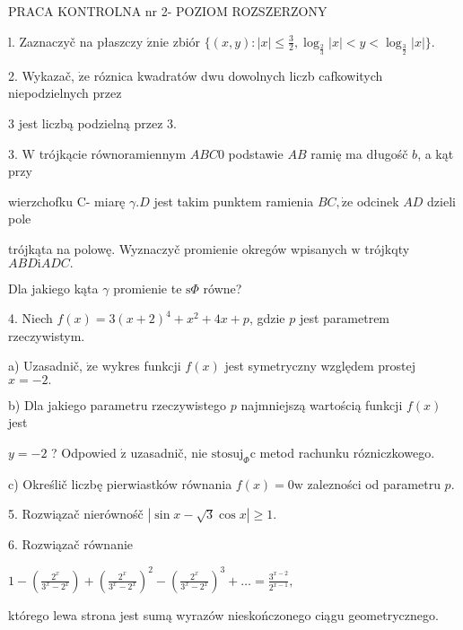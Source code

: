 \documentclass[a4paper,12pt]{article}
\begin{document}
PRACA KONTROLNA nr 2- POZIOM ROZSZERZONY

l. Zaznaczyč na płaszczy $\acute{\mathrm{z}}\mathrm{n}\mathrm{i}\mathrm{e}$ zbiór $\displaystyle \{(x,y):|x|\leq\frac{3}{2},\log_{\frac{2}{3}}|x|<y<\log_{\frac{3}{2}}|x|\}.$

2. Wykazač, $\dot{\mathrm{z}}\mathrm{e}$ róznica kwadratów dwu dowolnych liczb cafkowitych niepodzielnych przez

3 jest liczbą podzielną przez 3.

3. $\mathrm{W}$ trójkącie równoramiennym $ABC0$ podstawie $AB$ ramię ma długośč $b$, a kąt przy

wierzchofku C- miarę $\gamma. D$ jest takim punktem ramienia $BC, \dot{\mathrm{z}}\mathrm{e}$ odcinek $AD$ dzieli pole

trójkąta na polowę. Wyznaczyč promienie okregów wpisanych $\mathrm{w}$ trójkqty $ABD\mathrm{i}ADC.$

Dla jakiego kąta $\gamma$ promienie te $\mathrm{s}\Phi$ równe?

4. Niech $f(x)=3(x+2)^{4}+x^{2}+4x+p$, gdzie $p$ jest parametrem rzeczywistym.

a) Uzasadnič, $\dot{\mathrm{z}}\mathrm{e}$ wykres funkcji $f(x)$ jest symetryczny względem prostej $x=-2.$

b) Dla jakiego parametru rzeczywistego $p$ najmniejszą wartością funkcji $f(x)$ jest

$y=-2$ ? Odpowied $\acute{\mathrm{z}}$ uzasadnič, nie $\mathrm{s}\mathrm{t}\mathrm{o}\mathrm{s}\mathrm{u}\mathrm{j}_{\Phi}\mathrm{c}$ metod rachunku rózniczkowego.

c) Określič liczbę pierwiastków równania $f(x)=0\mathrm{w}$ zalezności od parametru $p.$

5. Rozwiązač nierównośč $|\sin x-\sqrt{3}\cos x|\geq 1.$

6. Rozwiązač równanie

$1-(\displaystyle \frac{2^{x}}{3^{x}-2^{x}})+(\frac{2^{x}}{3^{x}-2^{x}})^{2}-(\frac{2^{x}}{3^{x}-2^{x}})^{3}+\ldots=\frac{3^{x-2}}{2^{x-1}},$

którego lewa strona jest sumą wyrazów nieskończonego ciągu geometrycznego.
\end{document}
